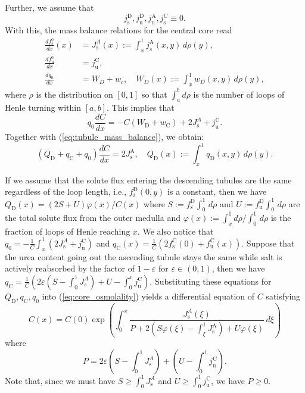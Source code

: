 \documentclass{article}
\begin{document}
Further, we assume that
\begin{equation}
    j_\mathrm{s}^\mathrm{D},j_\mathrm{u}^\mathrm{D},j_\mathrm{u}^\mathrm{A},j_\mathrm{s}^\mathrm{C}\equiv 0.
\end{equation}
With this, the mass balance relations for the central core read
\begin{align}
    \frac{d f_s^0}{dx}(x) &= J_\mathrm{s}^A(x):=\int_x^1 j_s^\mathrm{A}(x,y)\,d\rho(y),\\
    \frac{d f_\mathrm{u}^0}{dx} &= j_\mathrm{u}^\mathrm{C},\\
    \frac{dq_0}{dx} &= W_D+w_c,\quad W_D(x):= \int_x^1 w_D(x,y)\,d\rho(y),
\end{align}
    where $\rho$ is the distribution on $[0,1]$ so that $\int_a^bd\rho$ is the number of loops of Henle turning within $[a,b]$.
This implies that
\begin{equation}
    q_0\frac{dC}{dx} = -C(W_\mathrm{D}+w_\mathrm{C})+2J_\mathrm{s}^A+j_\mathrm{u}^\mathrm{C}.
\end{equation}
Together with (\ref{eq:tubule_mass_balance}), we obtain:
\begin{equation}\label{eq:core_osmolality}
    \left( Q_\mathrm{D}+q_\mathrm{C}+q_0 \right)\frac{dC}{dx} = 2J_\mathrm{s}^\mathrm{A},\quad Q_\mathrm{D}(x):=\int_x^1q_\mathrm{D}(x,y)\,d\rho(y).
\end{equation}

If we assume that the solute flux entering the descending tubules are the same regardless of the loop length, i.e., $f_i^\mathrm{D}(0,y)$ is a constant, then we have $Q_\mathrm{D}(x) = (2S+U)\varphi(x)/C(x)$ where $S:= f_\mathrm{s}^\mathrm{D}\int_0^1\,d\rho$ and $U:=f_\mathrm{u}^\mathrm{D}\int_0^1\,d\rho$ are the total solute flux from the outer medulla and $\varphi(x):=\int_x^1d\rho/\int_0^1\,d\rho$ is the fraction of loops of Henle reaching $x$.
We also notice that $q_0 = -\frac{1}{C}\int_x^1(2J_\mathrm{s}^A+j_\mathrm{u}^\mathrm{C})$ and $q_\mathrm{C}(x) = \frac{1}{C}(2f_\mathrm{s}^\mathrm{C}(0)+f_\mathrm{u}^\mathrm{C}(x))$.
Suppose that the urea content going out the ascending tubule stays the same while salt is actively reabsorbed by the factor of $1-\varepsilon$ for $\varepsilon\in(0,1)$, then we have $q_\mathrm{C} = \frac{1}{C}(2\varepsilon (S-\int_0^1J_s^A)+U-\int_0^x j_\mathrm{u}^\mathrm{C})$.
Substituting these equations for $Q_\mathrm{D},q_\mathrm{C},q_0$ into (\ref{eq:core_osmolality}) yields a differential equation of $C$ satisfying
\begin{equation}
    C(x) = C(0)\exp\left( \int_0^x\frac{J_\mathrm{s}^A(\xi)}{ P +2\left( S\varphi(\xi)-\int_\xi^1J_\mathrm{s}^\mathrm{A} \right)+U\varphi(\xi)}\,d\xi \right)
\end{equation}
where
\begin{equation}
    P = 2\varepsilon\left( S - \int_0^1 J_\mathrm{s}^A \right)+\left( U-\int_0^1j_\mathrm{u}^\mathrm{C} \right).
\end{equation}
Note that, since we must have $S\geq\int_0^1 J_\mathrm{s}^A$ and $U\geq \int_0^1j_\mathrm{u}^\mathrm{C}$, we have $P\geq 0$.
\end{document}
